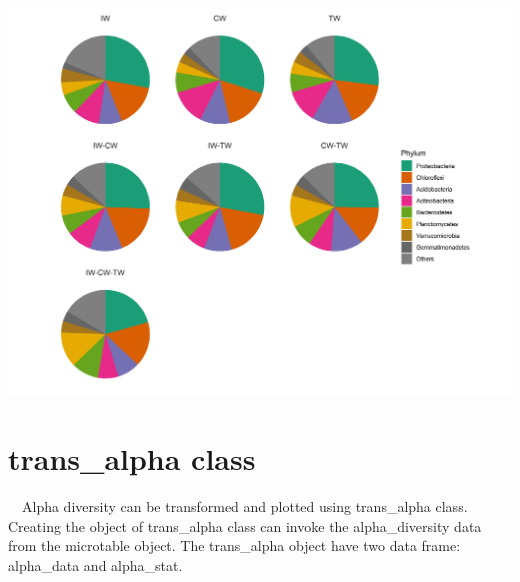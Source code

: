 \documentclass[
]{book}
\newenvironment{Shaded}{\begin{snugshade}}{\end{snugshade}}
\newcommand{\AttributeTok}[1]{\textcolor[rgb]{0.77,0.63,0.00}{#1}}
\newcommand{\DecValTok}[1]{\textcolor[rgb]{0.00,0.00,0.81}{#1}}
\newcommand{\FunctionTok}[1]{\textcolor[rgb]{0.00,0.00,0.00}{#1}}
\newcommand{\NormalTok}[1]{#1}
\newcommand{\OtherTok}[1]{\textcolor[rgb]{0.56,0.35,0.01}{#1}}
\newcommand{\SpecialCharTok}[1]{\textcolor[rgb]{0.00,0.00,0.00}{#1}}
\newcommand{\StringTok}[1]{\textcolor[rgb]{0.31,0.60,0.02}{#1}}
\begin{document}
\begin{Shaded}
\end{Shaded}

\begin{center}\includegraphics[width=800px]{Images/trans_venn_pie} \end{center}

\hypertarget{trans_alpha-class}{%
\section{trans\_alpha class}\label{trans_alpha-class}}

　Alpha diversity can be transformed and plotted using trans\_alpha class.
Creating the object of trans\_alpha class can invoke the alpha\_diversity data from the microtable object.
The trans\_alpha object have two data frame: alpha\_data and alpha\_stat.
\end{document}
